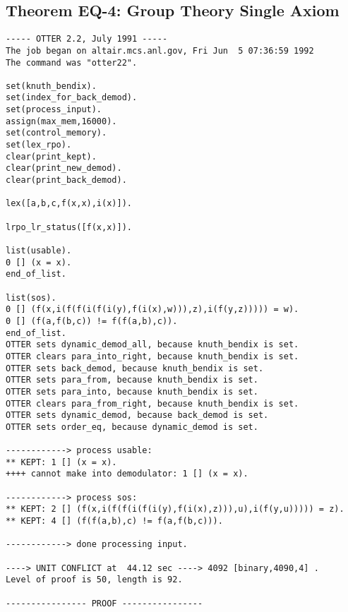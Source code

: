 \subsection{Theorem EQ-4: Group Theory Single Axiom}
{\small \begin{verbatim}
----- OTTER 2.2, July 1991 -----
The job began on altair.mcs.anl.gov, Fri Jun  5 07:36:59 1992
The command was "otter22".

set(knuth_bendix).
set(index_for_back_demod).
set(process_input).
assign(max_mem,16000).
set(control_memory).
set(lex_rpo).
clear(print_kept).
clear(print_new_demod).
clear(print_back_demod).

lex([a,b,c,f(x,x),i(x)]).

lrpo_lr_status([f(x,x)]).

list(usable).
0 [] (x = x).
end_of_list.

list(sos).
0 [] (f(x,i(f(f(i(f(i(y),f(i(x),w))),z),i(f(y,z))))) = w).
0 [] (f(a,f(b,c)) != f(f(a,b),c)).
end_of_list.
OTTER sets dynamic_demod_all, because knuth_bendix is set.
OTTER clears para_into_right, because knuth_bendix is set.
OTTER sets back_demod, because knuth_bendix is set.
OTTER sets para_from, because knuth_bendix is set.
OTTER sets para_into, because knuth_bendix is set.
OTTER clears para_from_right, because knuth_bendix is set.
OTTER sets dynamic_demod, because back_demod is set.
OTTER sets order_eq, because dynamic_demod is set.

------------> process usable:
** KEPT: 1 [] (x = x).
++++ cannot make into demodulator: 1 [] (x = x).

------------> process sos:
** KEPT: 2 [] (f(x,i(f(f(i(f(i(y),f(i(x),z))),u),i(f(y,u))))) = z).
** KEPT: 4 [] (f(f(a,b),c) != f(a,f(b,c))).

------------> done processing input.

----> UNIT CONFLICT at  44.12 sec ----> 4092 [binary,4090,4] .
Level of proof is 50, length is 92.

---------------- PROOF ----------------


\end{verbatim}}
